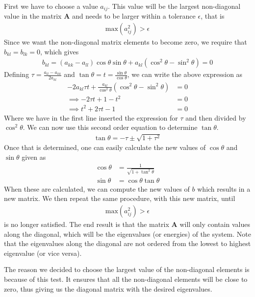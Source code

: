 \documentclass[12pt]{article}
\begin{document}
First we have to choose a value $a_{ij}$. This value will be the largest non-diagonal value in the matrix $\mathbf{A}$ and needs to be larger within a tolerance $\epsilon$, that is
\begin{align}
\text{max}(a_{ij}^2) > \epsilon
\end{align}
Since we want the non-diagonal matrix elements to become zero, we require that $b_{kl} = b_{lk} = 0$, which gives
\begin{align}
b_{kl} = (a_{kk} - a_{ll})\cos\theta\sin\theta + a_{kl}(\cos^2\theta - \sin^2\theta) = 0
\end{align}
Defining $\tau = \frac{a_{ll}-a_{kk}}{2a_{kl}}$ and $\tan\theta = t = \frac{\sin\theta}{\cos\theta}$, we can write the above expression as
\begin{align}
-2a_{kl}\tau t + \frac{a_{kl}}{\cos^2\theta}(\cos^2\theta - \sin^2\theta) &= 0 \nonumber \\
\implies -2\tau t + 1 - t^2 &= 0 \nonumber \\
\implies t^2 + 2\tau t - 1 &= 0
\end{align}
Where we have in the first line inserted the expression for $\tau$ and then divided by $\cos^2\theta$. We can now use this second order equation to determine $\tan\theta$.
\begin{align}
\tan\theta = -\tau \pm \sqrt{1+\tau^2}
\end{align} 
Once that is determined, one can easily calculate the new values of $\cos\theta$ and $\sin\theta$ given as
\begin{align}
\cos\theta &= \frac{1}{\sqrt{1 + \tan^2\theta}}\\
\sin\theta &= \cos\theta \tan\theta 
\end{align}
When these are calculated, we can compute the new values of $b$ which results in a new matrix. We then repeat the same procedure, with this new matrix, until
\begin{align}
\text{max}(a_{ij}^2) > \epsilon
\end{align}
is no longer satisfied. The end result is that the matrix $\mathbf{A}$ will only contain values along the diagonal, which will be the eigenvalues (or energies) of the system. Note that the eigenvalues along the diagonal are not ordered from the lowest to highest eigenvalue (or vice versa).

The reason we decided to choose the largest value of the non-diagonal elements is because of this test. It ensures that all the non-diagonal elements will be close to zero, thus giving us the diagonal matrix with the desired eigenvalues.
\end{document}
